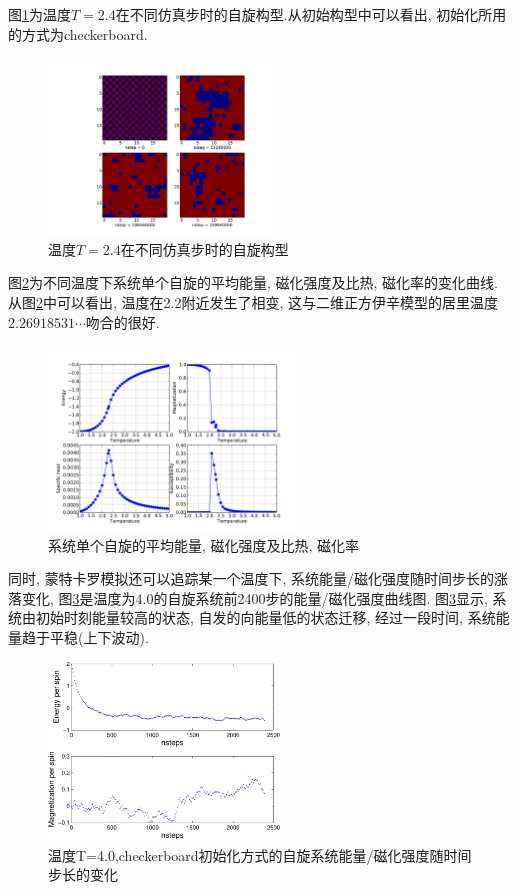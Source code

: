 \documentclass[11pt,a4paper,boxed]{caspset}
\begin{document}
图\ref{spin}为温度$T=2.4$在不同仿真步时的自旋构型.从初始构型中可以看出, 初始化所用的方式为checkerboard.
\begin{figure}[!htb]
\centering
\includegraphics[width=0.53\textwidth]{spin.pdf}
\caption{\label{spin}温度$T=2.4$在不同仿真步时的自旋构型}
\end{figure}
图\ref{energy}为不同温度下系统单个自旋的平均能量, 磁化强度及比热, 磁化率的变化曲线. 从图\ref{energy}中可以看出,
温度在2.2附近发生了相变, 这与二维正方伊辛模型的居里温度$2.26918531\cdots$吻合的很好.
\begin{figure}[!htb]
\centering
\includegraphics[width=0.6\textwidth]{em.pdf}
\caption{\label{energy}系统单个自旋的平均能量, 磁化强度及比热, 磁化率}
\end{figure}

同时, 蒙特卡罗模拟还可以追踪某一个温度下, 系统能量/磁化强度随时间步长的涨落变化,
图\ref{emchange}是温度为4.0的自旋系统前2400步的能量/磁化强度曲线图. 图\ref{emchange}显示, 系统由初始时刻能量较高的状态, 自发的向能量低的状态迁移, 经过一段时间, 系统能量趋于平稳(上下波动).
\begin{figure}[!htb]
\centering
\includegraphics[width=0.55\textwidth]{emchange.pdf}
\caption{\label{emchange}温度T=4.0,checkerboard初始化方式的自旋系统能量/磁化强度随时间步长的变化}
\end{figure}
\end{document}
